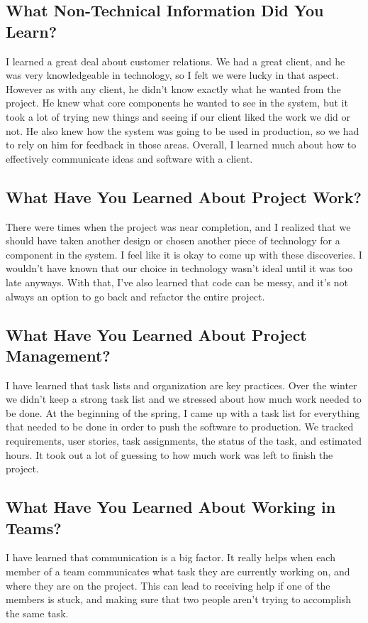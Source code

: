 \documentclass[10pt, onecolumn, twoside, peerreview]{IEEEtran}
\begin{document}
\subsection{What Non-Technical Information Did You Learn?}
I learned a great deal about customer relations. We had a great client, and he was very knowledgeable in technology, so I felt we were lucky in that aspect. However as with any client, he didn't know exactly what he wanted from the project. He knew what core components he wanted to see in the system, but it took a lot of trying new things and seeing if our client liked the work we did or not. He also knew how the system was going to be used in production, so we had to rely on him for feedback in those areas. Overall, I learned much about how to effectively communicate ideas and software with a client.

\subsection{What Have You Learned About Project Work?}
There were times when the project was near completion, and I realized that we should have taken another design or chosen another piece of technology for a component in the system. I feel like it is okay to come up with these discoveries. I wouldn't have known that our choice in technology wasn't ideal until it was too late anyways. With that, I've also learned that code can be messy, and it's not always an option to go back and refactor the entire project.

\subsection{What Have You Learned About Project Management?}
I have learned that task lists and organization are key practices. Over the winter we didn't keep a strong task list and we stressed about how much work needed to be done. At the beginning of the spring, I came up with a task list for everything that needed to be done in order to push the software to production. We tracked requirements, user stories, task assignments, the status of the task, and estimated hours. It took out a lot of guessing to how much work was left to finish the project.

\subsection{What Have You Learned About Working in Teams?}
I have learned that communication is a big factor. It really helps when each member of a team communicates what task they are currently working on, and where they are on the project. This can lead to receiving help if one of the members is stuck, and making sure that two people aren't trying to accomplish the same task.
\end{document}
